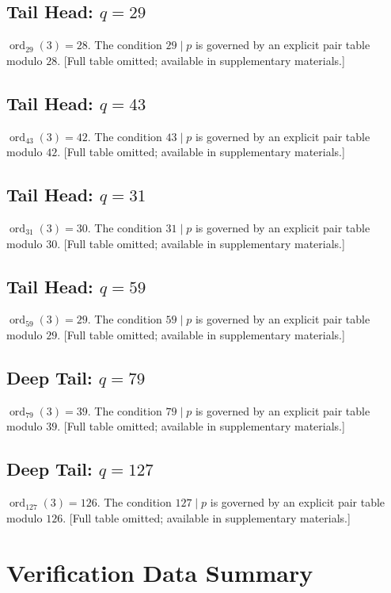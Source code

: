 \documentclass[11pt,letterpaper]{article}
\begin{document}
\subsection{Tail Head: $q = 29$}
$\operatorname{ord}_{29}(3) = 28$.
The condition $29 \mid p$ is governed by an explicit pair table modulo $28$.
[Full table omitted; available in supplementary materials.]

\subsection{Tail Head: $q = 43$}
$\operatorname{ord}_{43}(3) = 42$.
The condition $43 \mid p$ is governed by an explicit pair table modulo $42$.
[Full table omitted; available in supplementary materials.]

\subsection{Tail Head: $q = 31$}
$\operatorname{ord}_{31}(3) = 30$.
The condition $31 \mid p$ is governed by an explicit pair table modulo $30$.
[Full table omitted; available in supplementary materials.]

\subsection{Tail Head: $q = 59$}
$\operatorname{ord}_{59}(3) = 29$.
The condition $59 \mid p$ is governed by an explicit pair table modulo $29$.
[Full table omitted; available in supplementary materials.]

\subsection{Deep Tail: $q = 79$}
$\operatorname{ord}_{79}(3) = 39$.
The condition $79 \mid p$ is governed by an explicit pair table modulo $39$.
[Full table omitted; available in supplementary materials.]

\subsection{Deep Tail: $q = 127$}
$\operatorname{ord}_{127}(3) = 126$.
The condition $127 \mid p$ is governed by an explicit pair table modulo $126$.
[Full table omitted; available in supplementary materials.]

\section{Verification Data Summary}\label{app:data}
\end{document}
